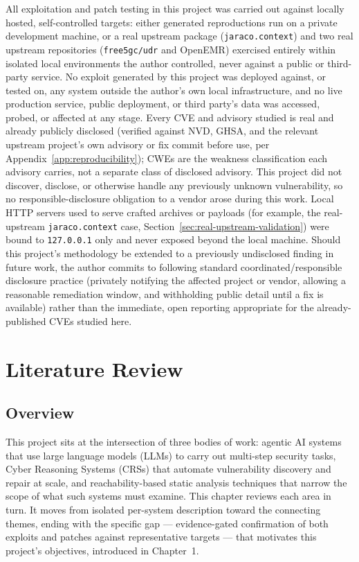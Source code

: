 \documentclass[12pt,a4paper]{report}
\begin{document}
All exploitation and patch testing in this project was carried out against locally hosted, self-controlled targets: either generated reproductions run on a private development machine, or a real upstream package (\texttt{jaraco.context}) and two real upstream repositories (\texttt{free5gc/udr} and OpenEMR) exercised entirely within isolated local environments the author controlled, never against a public or third-party service. No exploit generated by this project was deployed against, or tested on, any system outside the author's own local infrastructure, and no live production service, public deployment, or third party's data was accessed, probed, or affected at any stage. Every CVE and advisory studied is real and already publicly disclosed (verified against NVD, GHSA, and the relevant upstream project's own advisory or fix commit before use, per Appendix~\ref{app:reproducibility}); CWEs are the weakness classification each advisory carries, not a separate class of disclosed advisory. This project did not discover, disclose, or otherwise handle any previously unknown vulnerability, so no responsible-disclosure obligation to a vendor arose during this work. Local HTTP servers used to serve crafted archives or payloads (for example, the real-upstream \texttt{jaraco.context} case, Section~\ref{sec:real-upstream-validation}) were bound to \texttt{127.0.0.1} only and never exposed beyond the local machine. Should this project's methodology be extended to a previously undisclosed finding in future work, the author commits to following standard coordinated/responsible disclosure practice (privately notifying the affected project or vendor, allowing a reasonable remediation window, and withholding public detail until a fix is available) rather than the immediate, open reporting appropriate for the already-published CVEs studied here.

\chapter{Literature Review}
\label{chap:literature-review}

\section{Overview}

This project sits at the intersection of three bodies of work: agentic AI systems that use large language models (LLMs) to carry out multi-step security tasks, Cyber Reasoning Systems (CRSs) that automate vulnerability discovery and repair at scale, and reachability-based static analysis techniques that narrow the scope of what such systems must examine. This chapter reviews each area in turn. It moves from isolated per-system description toward the connecting themes, ending with the specific gap — evidence-gated confirmation of both exploits and patches against representative targets — that motivates this project's objectives, introduced in Chapter~1.
\end{document}
